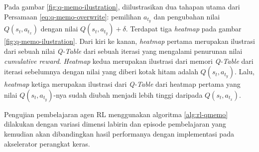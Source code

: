 Pada gambar \ref{fig:q-memo-ilustration}, diilustrasikan dua tahapan utama dari Persamaan \ref{eq:q-memo-overwrite}: pemilihan $a_{t_y}$ dan pengubahan nilai  $Q(s_{t},a_{t_x})$ dengan nilai $Q(s_{t},a_{t_y}) + \delta$. Terdapat tiga \textit{heatmap} pada gambar \ref{fig:q-memo-ilustration}. Dari kiri ke kanan, \textit{heatmap} pertama merupakan ilustrasi dari sebuah nilai \textit{Q-Table} dari sebuah iterasi yang mengalami penurunan nilai \textit{cumulative reward}. \textit{Heatmap} kedua merupakan ilustrasi dari memori \textit{Q-Table} dari iterasi sebelumnya dengan nilai yang diberi kotak hitam adalah $Q(s_{t},a_{t_y})$. Lalu, \textit{heatmap} ketiga merupakan ilustrasi dari \textit{Q-Table} dari heatmap pertama yang nilai $Q(s_{t},a_{t_y})$-nya sudah diubah menjadi lebih tinggi daripada $Q(s_{t},a_{t_x})$.

Pengujian pembelajaran agen \ac{RL} menggunakan algoritma \ref{alg:rl-qmemo} dilakukan dengan variasi dimensi labirin dan episode pembelajaran yang kemudian akan dibandingkan hasil performanya dengan implementasi pada akselerator perangkat keras.
